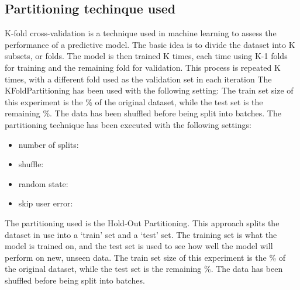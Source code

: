 \documentclass[11pt]{article}
\begin{document}

\subsection{Partitioning techinque used}\label{subsec:partitioning}
K-fold cross-validation is a technique used in machine learning to assess
the performance of a predictive model. The basic idea is to divide the dataset
into K subsets, or folds. The model is then trained K times, each time using K-1
folds for training and the remaining fold for validation. This process is
repeated K times, with a different fold used as the validation set in each iteration
\hfill\break
\hfill\break
The KFoldPartitioning has been used with the following setting:
\hfill\break
\hfill\break
The train set size of this experiment is the \%
of the original dataset, while the test set is the remaining \%.
\hfill\break
\hfill\break
{}
The data has been shuffled before being split into batches.
The partitioning technique has been executed with the following settings:
\begin{itemize}
    \item number of splits: 
    \item shuffle: 
    \item random state: 
    \item skip user error: 
\end{itemize}
\hfill\break
\hfill\break
{}


The partitioning used is the Hold-Out Partitioning.
This approach splits the dataset in use into a ‘train’ set and a ‘test’ set.
The training set is what the model is trained on, and the test set is used to see how
well the model will perform on new, unseen data.
\hfill\break
\hfill\break
The train set size of this experiment is the \%
of the original dataset, while the test set is the remaining \%.
\hfill\break
\hfill\break
{}
The data has been shuffled before being split into batches.
\hfill\break
\hfill\break
\end{document}
